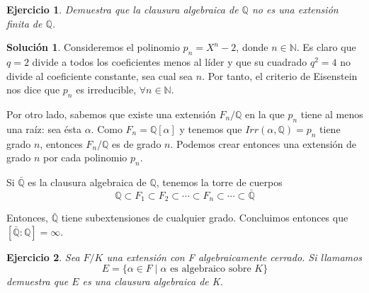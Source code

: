 \documentclass[a4paper, 11pt]{article}
\newtheorem{ejercicio}{Ejercicio}
\theoremstyle{definition}
\newtheorem*{solucion}{Solución}
\theoremstyle{remark}
\begin{document}
  \newpage

  \begin{ejercicio}
      Demuestra que la clausura algebraica de $\mathbb{Q}$ no es una extensión finita de $\mathbb{Q}$.
  \end{ejercicio}

  \begin{solucion}
      Consideremos el polinomio $p_n = X^n-2$, donde $n\in\mathbb{N}$. Es claro que $q=2$ divide a todos los coeficientes menos al líder y que su cuadrado $q^2=4$ no divide al coeficiente constante, sea cual sea $n$. Por tanto, el criterio de Eisenstein nos dice que $p_n$ es irreducible, $\forall n \in \mathbb{N}$.

      Por otro lado, sabemos que existe una extensión $F_n/\mathbb{Q}$ en la que $p_n$ tiene al menos una raíz: sea ésta $\alpha$. Como $F_n=\mathbb{Q}[\alpha]$ y tenemos que $Irr(\alpha,\mathbb{Q}) = p_n$ tiene grado $n$, entonces $F_n/\mathbb{Q}$ es de grado $n$. Podemos crear entonces una extensión de grado $n$ por cada polinomio $p_n$.

      Si $\bar{\mathbb{Q}}$ es la clausura algebraica de $\mathbb{Q}$, tenemos la torre de cuerpos
      \[
      \mathbb{Q} \subset F_1 \subset F_2 \subset \cdots \subset F_n \subset \cdots \subset \bar{\mathbb{Q}}
      \]

      Entonces, $\bar{\mathbb{Q}}$ tiene subextensiones de cualquier grado. Concluimos entonces que $[\bar{\mathbb{Q}}:\mathbb{Q}] = \infty$.
  \end{solucion}

  \begin{ejercicio}
      Sea $F/K$ una extensión con F algebraicamente cerrado. Si llamamos
      \[
      E = \{\alpha\in F \;|\; \text{$\alpha$ es algebraico sobre $K$}\}
      \]
      demuestra que $E$ es una clausura algebraica de K.
  \end{ejercicio}
\end{document}
